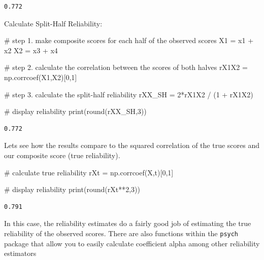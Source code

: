 \documentclass[
  letterpaper,
  DIV=11,
  numbers=noendperiod]{scrreprt}
\newenvironment{Shaded}{\begin{snugshade}}{\end{snugshade}}
\newcommand{\BuiltInTok}[1]{\textcolor[rgb]{0.00,0.23,0.31}{#1}}
\newcommand{\CommentTok}[1]{\textcolor[rgb]{0.37,0.37,0.37}{#1}}
\newcommand{\DecValTok}[1]{\textcolor[rgb]{0.68,0.00,0.00}{#1}}
\newcommand{\NormalTok}[1]{\textcolor[rgb]{0.00,0.23,0.31}{#1}}
\newcommand{\OperatorTok}[1]{\textcolor[rgb]{0.37,0.37,0.37}{#1}}
\begin{document}
\begin{verbatim}
0.772
\end{verbatim}

Calculate Split-Half Reliability:

\begin{Shaded}
\begin{Highlighting}[]
\CommentTok{\# step 1. make composite scores for each half of the observed scores}
\NormalTok{X1 }\OperatorTok{=}\NormalTok{ x1 }\OperatorTok{+}\NormalTok{ x2}
\NormalTok{X2 }\OperatorTok{=}\NormalTok{ x3 }\OperatorTok{+}\NormalTok{ x4}

\CommentTok{\# step 2. calculate the correlation between the scores of both halves}
\NormalTok{rX1X2 }\OperatorTok{=}\NormalTok{ np.corrcoef(X1,X2)[}\DecValTok{0}\NormalTok{,}\DecValTok{1}\NormalTok{]}

\CommentTok{\# step 3. calculate the split{-}half reliability}
\NormalTok{rXX\_SH }\OperatorTok{=} \DecValTok{2}\OperatorTok{*}\NormalTok{rX1X2 }\OperatorTok{/}\NormalTok{ (}\DecValTok{1} \OperatorTok{+}\NormalTok{ rX1X2)}

\CommentTok{\# display reliability}
\BuiltInTok{print}\NormalTok{(}\BuiltInTok{round}\NormalTok{(rXX\_SH,}\DecValTok{3}\NormalTok{)) }
\end{Highlighting}
\end{Shaded}

\begin{verbatim}
0.772
\end{verbatim}

Lets see how the results compare to the squared correlation of the true
scores and our composite score (true reliability).

\begin{Shaded}
\begin{Highlighting}[]
\CommentTok{\# calculate true reliability}
\NormalTok{rXt }\OperatorTok{=}\NormalTok{ np.corrcoef(X,t)[}\DecValTok{0}\NormalTok{,}\DecValTok{1}\NormalTok{]}

\CommentTok{\# display reliability}
\BuiltInTok{print}\NormalTok{(}\BuiltInTok{round}\NormalTok{(rXt}\OperatorTok{**}\DecValTok{2}\NormalTok{,}\DecValTok{3}\NormalTok{)) }
\end{Highlighting}
\end{Shaded}

\begin{verbatim}
0.791
\end{verbatim}

In this case, the reliability estimates do a fairly good job of
estimating the true reliability of the observed scores. There are also
functions within the \texttt{psych} package that allow you to easily
calculate coefficient alpha among other reliability estimators
\end{document}
